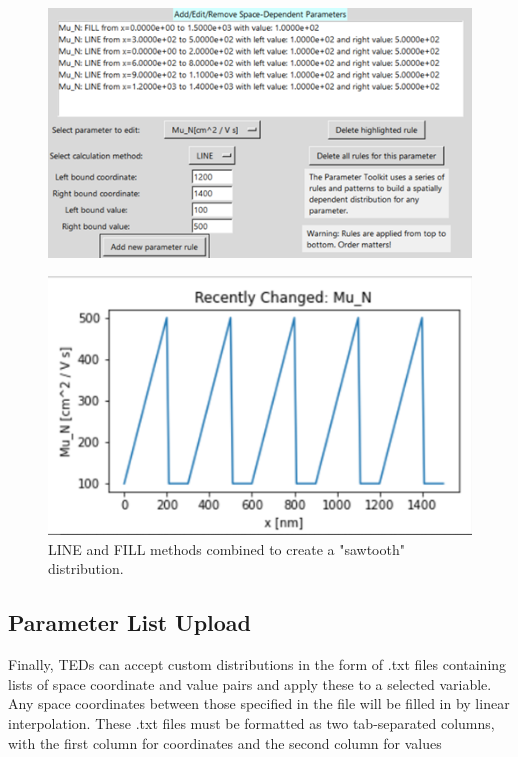 \documentclass[11pt,letterpaper,titlepage]{article}
\begin{document}
		\begin{figure}[H]
			\label{fig:ptoolkit_mixed}
			\centering
			\includegraphics[scale=1]{"ptoolkit_mixed"}
		\end{figure}
		\begin{figure}[H]
			\label{fig:ptoolkit_mixed_plot}
			\centering
			\includegraphics[scale=1]{"ptoolkit_mixed_plot"}
			\caption{LINE and FILL methods combined to create a "sawtooth" distribution.}
		\end{figure}
	
		\newpage
		\subsection{Parameter List Upload}
		\par Finally, TEDs can accept custom distributions in the form of .txt files containing lists of space coordinate and value pairs and apply these to a selected variable. Any space coordinates between those specified in the file will be filled in by linear interpolation. These .txt files must be formatted as two tab-separated columns, with the first column for coordinates and the second column for values
		
\end{document}
